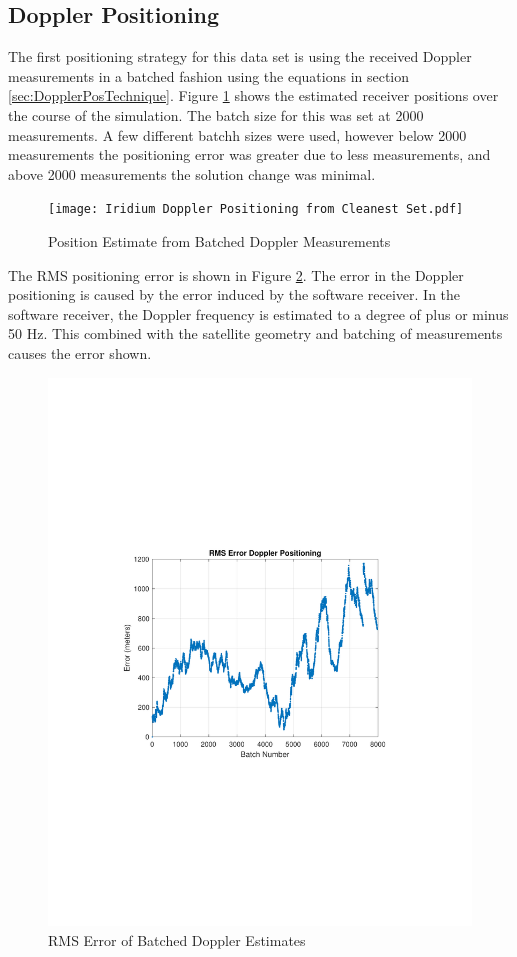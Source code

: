 \documentclass[12pt]{report}
\begin{document}
\subsection{Doppler Positioning}
The first positioning strategy for this data set is using the received Doppler measurements in a batched fashion using the equations in section \ref{sec:DopplerPosTechnique}. Figure \ref{fig:cleaniriddopgeo} shows the estimated receiver positions over the course of the simulation. The batch size for this was set at 2000 measurements. A few different batchh sizes were used, however below 2000 measurements the positioning error was greater due to less measurements, and above 2000 measurements the solution change was minimal. 

\begin{figure}[h!]
    \centering
    \texttt{[image: Iridium Doppler Positioning from Cleanest Set.pdf]}
    \caption{Position Estimate from Batched Doppler Measurements}
    \label{fig:cleaniriddopgeo}
\end{figure}
The RMS positioning error is shown in Figure \ref{fig:RMSErrorBatchDoppler}. The error in the Doppler positioning is caused by the error induced by the software receiver. In the software receiver, the Doppler frequency is estimated to a degree of plus or minus 50 Hz. This combined with the satellite geometry and batching of measurements causes the error shown. 

\begin{figure}[h!]
    \centering
    \includegraphics[trim=1.2in 3.3in 1.75in 3.3in,clip,width=5in]{Iridium RMSE plot Doppler Cleanest file.pdf}
    \caption{RMS Error of Batched Doppler Estimates}
    \label{fig:RMSErrorBatchDoppler}
\end{figure}
\end{document}

